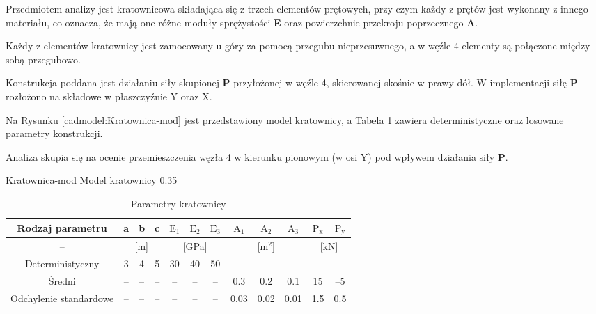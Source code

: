 Przedmiotem analizy jest kratownicowa składająca się z trzech elementów prętowych, przy czym każdy z prętów jest wykonany
z innego materiału, co oznacza, że mają one różne moduły sprężystości \textbf{E} oraz powierzchnie przekroju poprzecznego \textbf{A}.

Każdy z elementów kratownicy jest zamocowany u góry za pomocą przegubu nieprzesuwnego, a w węźle 4 elementy są połączone między sobą przegubowo.

Konstrukcja poddana jest działaniu siły skupionej \textbf{P} przyłożonej w węźle 4, skierowanej skośnie w prawy dół.
W implementacji siłę \textbf{P} rozłożono na składowe w płaszczyźnie Y oraz X.

Na Rysunku \ref{cadmodel:Kratownica-mod} jest przedstawiony model kratownicy, a Tabela \ref{tab:parametry-kratownica} zawiera deterministyczne oraz losowane parametry konstrukcji.

Analiza skupia się na ocenie przemieszczenia węzła 4 w kierunku pionowym (w osi Y) pod wpływem działania siły \textbf{P}.

\cadmodel
{Kratownica-mod}
{Model kratownicy}
{0.35}

\begin{table}[H]
    \centering
    \begin{tabular}{|c|c|c|c|c|c|c|c|c|c|c|c|}
        \hline
        Rodzaj parametru & a & b & c & $\mathrm{E}_\mathrm{1}$ & $\mathrm{E}_\mathrm{2}$ & $\mathrm{E}_\mathrm{3}$ & $\mathrm{A}_\mathrm{1}$ & $\mathrm{A}_\mathrm{2}$ & $\mathrm{A}_\mathrm{3}$ & $\mathrm{P}_\mathrm{x}$ & $\mathrm{P}_\mathrm{y}$ \\
        \hline
        – & \multicolumn{3}{|c|}{[m]} & \multicolumn{3}{|c|}{[GPa]} & \multicolumn{3}{|c|}{[$\mathrm{m}^\mathrm{2}$]} & \multicolumn{2}{|c|}{[kN]} \\
        \hline
        Deterministyczny & 3 & 4 & 5 & 30 & 40 & 50 & – & – & – & – & – \\
        \hline
        Średni & – & – & – & – & – & – & 0.3 & 0.2 & 0.1 & 15 & –5 \\
        \hline
        Odchylenie standardowe & – & – & – & – & – & – & 0.03 & 0.02 & 0.01 & 1.5 & 0.5 \\
        \hline
    \end{tabular}
    \caption{Parametry kratownicy}
    \label{tab:parametry-kratownica}
\end{table}

